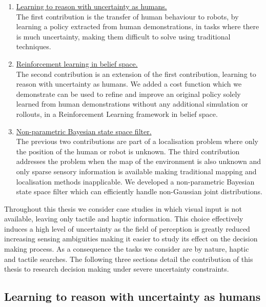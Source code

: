 \begin{enumerate}
 \item[\ref{sub:contr1}] \hyperref[sub:contr1]{Learning to reason with uncertainty as humans.}\\
 The first contribution is the transfer of human behaviour to robots, by learning a policy extracted from 
 human demonstrations, in tasks where there is much uncertainty, making them difficult to solve using traditional techniques.
 \item[\ref{sub:contr2}] \hyperref[sub:contr2]{Reinforcement learning in belief space.}\\
 The second contribution is an extension of the first contribution, learning to reason with uncertainty as humans.
 We added a cost function which we demonstrate can be used to refine and improve an original policy solely learned from human demonstrations
 without any additional simulation or rollouts, in a Reinforcement Learning framework in belief space. 
 \item[\ref{sub:contr3}] \hyperref[sub:contr3]{Non-parametric Bayesian state space filter.}\\
  The previous two contributions are part of a localisation problem where only the position of the human or robot is unknown.
  The third contribution addresses the problem when the map of the environment is also unknown and only sparse sensory information is available
  making traditional mapping and localisation methods inapplicable. We developed a non-parametric Bayesian state space filter which can efficiently
  handle non-Gaussian joint distributions. 
\end{enumerate}

Throughout this thesis we consider case studies in which visual input is not available, leaving only tactile and 
haptic information. This choice effectively induces a high level of uncertainty as the field of perception is greatly reduced increasing 
sensing ambiguities making it easier to study its effect on the decision making process. As a consequence the tasks we consider are by nature, haptic and tactile searches.
The following three sections detail the contribution of this thesis to research decision making under severe 
uncertainty constraints.

\subsection{Learning to reason with uncertainty as humans}\label{sub:contr1}

